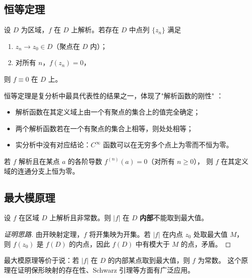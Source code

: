 
\subsection{恒等定理}

\begin{theorem}
设 $D$ 为区域，$f$ 在 $D$ 上解析。若存在 $D$ 中点列 $\{z_n\}$ 满足
\begin{enumerate}  \item $z_n \to z_0 \in D$（聚点在 $D$ 内）；
  \item 对所有 $n$，$f(z_n) = 0$，
\end{enumerate}
则 $f \equiv 0$ 在 $D$ 上。
\end{theorem}

\begin{remark}
恒等定理是复分析中最具代表性的结果之一，体现了"解析函数的刚性" ：
\begin{itemize}
  \item 解析函数在其定义域上由一个有聚点的集合上的值完全确定；
  \item 两个解析函数若在一个有聚点的集合上相等，则处处相等；
  \item 实分析中没有对应结论：$C^\infty$ 函数可以在无穷多个点上为零而不恒为零。
\end{itemize}
\end{remark}

\begin{corollary}
若 $f$ 解析且在某点 $a$ 的各阶导数 $f^{(n)}(a) = 0$（对所有 $n \geq 0$），
则 $f$ 在其定义域的连通分支上恒为零。
\end{corollary}

\subsection{最大模原理}

\begin{theorem}
设 $f$ 在区域 $D$ 上解析且非常数。则 $|f|$ 在 $D$ \textbf{内部}不能取到最大值。
\end{theorem}

\begin{proof}[证明思路]
由开映射定理，$f$ 将开集映为开集。若 $|f|$ 在内点 $z_0$ 处取最大值 $M$，
则 $f(z_0)$ 是 $f(D)$ 的内点，因此 $f(D)$ 中有模大于 $M$ 的点，矛盾。
\end{proof}

\begin{remark}
最大模原理等价于说：若 $|f|$ 在 $D$ 的内部某点取到最大值，则 $f$ 为常数。
这个原理在证明保形映射的存在性、Schwarz 引理等方面有广泛应用。
\end{remark}

